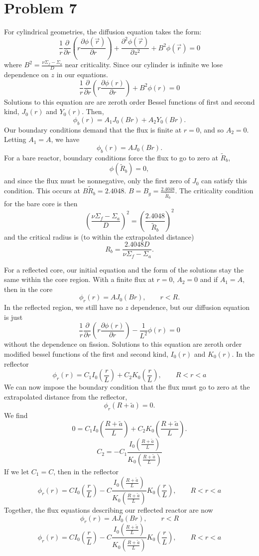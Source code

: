 \documentclass{article}
\newcommand{\p}{\partial}
\newcommand{\Xs}{\Sigma}
\newcommand{\pos}{\vec{r}}
\begin{document}

\section*{Problem 7}

For cylindrical geometries, the diffusion equation takes the form:
$$ \frac{1}{r}\frac{\p}{\p r}\left(r \frac{\p \phi(\pos)}{\p r}\right) + \frac{\p^2 \phi(\pos)}{\p z^2} + B^2\phi(\pos) = 0$$
where $B^2 = \frac{\nu\Xs_f - \Xs_a}{D} $ near criticality. 
Since our cylinder is infinite we lose dependence on $z$ in our equations.
$$ \frac{1}{r}\frac{\p}{\p r}\left(r \frac{\p \phi(r)}{\p r}\right) + B^2\phi(r) = 0$$
Solutions to this equation are are zeroth order Bessel functions of first and second kind, $J_0(r)$ and $Y_0(r)$. 
Then,
$$ \phi_b(r) = A_1 J_0(B r) + A_2 Y_0(B r) .$$
Our boundary conditions demand that the flux is finite at $r = 0$, and so $A_2 = 0$. 
Letting $A_1 = A$, we have
$$ \phi_b(r) = A J_0(B r) .$$
For a bare reactor, boundary conditions force the flux to go to zero at $\tilde{R}_b$,
$$ \phi(\tilde{R}_b) = 0 ,$$
and since the flux must be nonnegative, only the first zero of $J_0$ can satisfy this condition. This occurs at $B \tilde{R}_b = 2.4048$. $B = B_g = \frac{2.4048}{\tilde{R}_b}$. The criticality condition for the bare core is then 
$$ \left(\frac{\nu\Xs_f - \Xs_a}{D}\right)^2 = \left(\frac{2.4048}{\tilde{R}_b}\right)^2 $$
and the critical radius is (to within the extrapolated distance)
$$ R_b = \frac{2.4048 D}{\nu\Xs_f - \Xs_a} .$$

For a reflected core, our initial equation and the form of the solutions stay the same within the core region. With a finite flux at $r=0$, $A_2 = 0$ and if $A_1 = A$, then in the core 
$$ \phi_{r}(r) = A J_0(B r), \qquad r<R.$$
In the reflected region, we still have no $z$ dependence, but our diffusion equation is just
$$ \frac{1}{r}\frac{\p}{\p r}\left(r \frac{\p \phi(r)}{\p r}\right) - \frac{1}{L^2}\phi(r) = 0$$
without the dependence on fission. Solutions to this equation are zeroth order modified bessel functions of the first and second kind, $I_0(r)$ and $K_0(r)$. In the reflector
$$ \phi_{r}(r) = C_1 I_0(\frac{r}{L}) + C_2 K_0(\frac{r}{L}), \qquad R<r<a$$
We can now impose the boundary condition that the flux must go to zero at the extrapolated distance from the reflector,
$$ \phi_{r}(R+\tilde{a}) = 0 .$$
We find
$$ 0 = C_1 I_0(\frac{R+\tilde{a}}{L}) + C_2 K_0(\frac{R+\tilde{a}}{L}) .$$
$$ C_2 = -C_1 \frac{I_0(\frac{R+\tilde{a}}{L})}{K_0(\frac{R+\tilde{a}}{L})} $$
If we let $C_1 = C$, then in the reflector
$$ \phi_{r}(r) = C I_0(\frac{r}{L}) - C \frac{I_0(\frac{R+\tilde{a}}{L})}{K_0(\frac{R+\tilde{a}}{L})} K_0(\frac{r}{L}), \qquad R<r<a$$
Together, the flux equations describing our reflected reactor are now
$$ \phi_{r}(r) = A J_0(B r), \qquad r<R$$
$$ \phi_{r}(r) = C I_0(\frac{r}{L}) - C \frac{I_0(\frac{R+\tilde{a}}{L})}{K_0(\frac{R+\tilde{a}}{L})} K_0(\frac{r}{L}), \qquad R<r<a$$
\end{document}
